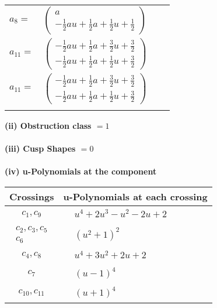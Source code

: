 \documentclass[1p]{elsarticle_modified}
\theoremstyle{definition}
\begin{document}
\begin{tabular}{m{7pt} m{180pt} m{7pt} m{180pt} }
\flushright $a_{8}=$&$\begin{pmatrix}a\\-\frac{1}{2} a u+\frac{1}{2} a+\frac{1}{2} u+\frac{1}{2}\end{pmatrix}$ \\
\flushright $a_{11}=$&$\begin{pmatrix}-\frac{1}{2} a u+\frac{1}{2} a+\frac{3}{2} u+\frac{3}{2}\\-\frac{1}{2} a u+\frac{1}{2} a+\frac{1}{2} u+\frac{3}{2}\end{pmatrix}$\\ \flushright $a_{11}=$&$\begin{pmatrix}-\frac{1}{2} a u+\frac{1}{2} a+\frac{3}{2} u+\frac{3}{2}\\-\frac{1}{2} a u+\frac{1}{2} a+\frac{1}{2} u+\frac{3}{2}\end{pmatrix}$\\&\end{tabular}
\flushleft \textbf{(ii) Obstruction class $= 1$}\\~\\
\flushleft \textbf{(iii) Cusp Shapes $= 0$}\\~\\
\newpage\renewcommand{\arraystretch}{1}
\flushleft \textbf{(iv) u-Polynomials at the component}\newline \\
\begin{tabular}{m{50pt}|m{274pt}}
Crossings & \hspace{64pt}u-Polynomials at each crossing \\
\hline $$\begin{aligned}c_{1},c_{9}\end{aligned}$$&$\begin{aligned}
&u^4+2 u^3- u^2-2 u+2
\end{aligned}$\\
\hline $$\begin{aligned}c_{2},c_{3},c_{5}\\c_{6}\end{aligned}$$&$\begin{aligned}
&(u^2+1)^2
\end{aligned}$\\
\hline $$\begin{aligned}c_{4},c_{8}\end{aligned}$$&$\begin{aligned}
&u^4+3 u^2+2 u+2
\end{aligned}$\\
\hline $$\begin{aligned}c_{7}\end{aligned}$$&$\begin{aligned}
&(u-1)^4
\end{aligned}$\\
\hline $$\begin{aligned}c_{10},c_{11}\end{aligned}$$&$\begin{aligned}
&(u+1)^4
\end{aligned}$\\
\hline
\end{tabular}\\~\\
\end{document}
